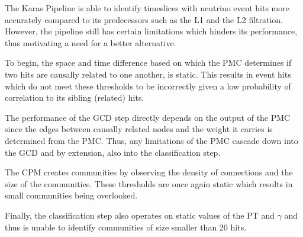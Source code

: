 The Karas Pipeline is able to identify timeslices with neutrino event
hits more accurately compared to its predecessors such as the L1 and
the L2 filtration. However, the pipeline still has certain limitations
which hinders its performance, thus motivating a need for a better
alternative.

To begin, the space and time difference based on which the PMC
determines if two hits are causally related to one another, is static.
This results in event hits which do not meet these thresholds to be
incorrectly given a low probability of correlation to its sibling
(related) hits.

The performance of the GCD step directly depends on the output of the
PMC since the edges between causally related nodes and the weight it
carries is determined from the PMC. Thus, any limitations of the PMC
cascade down into the GCD and by extension, also into the
classification step.


The CPM creates communities by observing the density of connections
and the size of the communities. These thresholds are once again
static which results in small communities being overlooked.

Finally, the classification step also operates on static values of the
PT and $\gamma$ and thus is unable to identify communities of size
smaller than 20 hits.

